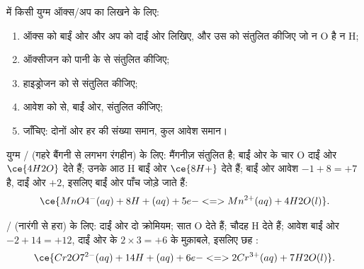 \begin{method}\label{met:g11:redox:balance}
 में किसी युग्म ऑक्स/अप का  लिखने के लिए:
\begin{enumerate}
  \item ऑक्स को बाईं ओर और अप को दाईं ओर लिखिए, और उस  को संतुलित कीजिए
        जो न O है न H;
  \item ऑक्सीजन  को पानी के   से संतुलित कीजिए;
  \item हाइड्रोजन  को   से संतुलित कीजिए;
  \item आवेश को   से, बाईं ओर, संतुलित कीजिए;
  \item जाँचिए: दोनों ओर हर  की संख्या समान, कुल आवेश
        समान।
\end{enumerate}
\end{method}

\begin{example}\label{ex:g11:redox:permanganate}
युग्म / (गहरे बैंगनी से लगभग
रंगहीन) के लिए: मैंगनीज़ संतुलित है; बाईं ओर के चार O दाईं ओर
$\ce{4H2O}$ देते हैं; उनके आठ H बाईं ओर $\ce{8H+}$ देते हैं; बाईं ओर
आवेश $-1 + 8 = +7$ है, दाईं ओर $+2$, इसलिए बाईं ओर पाँच
 जोड़े जाते हैं:
\[
  \ce{MnO4^-(aq) + 8H+(aq) + 5e- <=> Mn^{2+}(aq) + 4H2O(l)}.
\]
\end{example}

\begin{example}[डाइक्रोमेट आयन]\label{ex:g11:redox:dichromate}
/ (नारंगी से हरा) के लिए: दाईं ओर दो क्रोमियम;
सात O  देते हैं; चौदह H  देते हैं; आवेश
बाईं ओर $-2 + 14 = +12$, दाईं ओर के $2 \times 3 = +6$ के मुक़ाबले, इसलिए
छह :
\[
  \ce{Cr2O7^{2-}(aq) + 14H+(aq) + 6e- <=> 2Cr^{3+}(aq) + 7H2O(l)}.
\]
\end{example}

